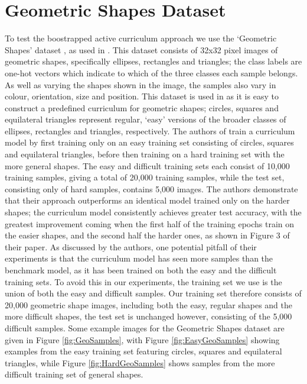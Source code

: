 \section{Geometric Shapes Dataset}\label{sec:GeoShapes}
To test the boostrapped active curriculum approach we use the `Geometric Shapes' dataset \cite{GeoShapes}, as used in \cite{Bengio2009}. This dataset consists of 32x32 pixel images of geometric shapes, specifically ellipses, rectangles and triangles; the class labels are one-hot vectors which indicate to which of the three classes each sample belongs. As well as varying the shapes shown in the image, the samples also vary in colour, orientation, size and position. This dataset is used in \cite{Bengio2009} as it is easy to construct a predefined curriculum for geometric shapes; circles, squares and equilateral triangles represent regular, `easy' versions of the broader classes of ellipses, rectangles and triangles, respectively. The authors of \cite{Bengio2009} train a curriculum model by first training only on an easy training set consisting of circles, squares and equilateral triangles, before then training on a hard training set with the more general shapes. The easy and difficult training sets each consist of 10,000 training samples, giving a total of 20,000 training samples, while the test set, consisting only of hard samples, contains 5,000 images. The authors demonstrate that their approach outperforms an identical model trained only on the harder shapes; the curriculum model consistently achieves greater test accuracy, with the greatest improvement coming  when the first half of the training epochs train on the easier shapes, and the second half the harder ones, as shown in Figure 3 of their paper. As discussed by the authors, one potential pitfall of their experiments is that the curriculum model has seen more samples than the benchmark model, as it has been trained on both the easy and the difficult training sets. To avoid this in our experiments, the training set we use is the union of both the easy and difficult samples. Our training set therefore consists of 20,000 geometric shape images, including both the easy, regular shapes and the more difficult shapes, the test set is unchanged however, consisting of the 5,000 difficult samples. Some example images for the Geometric Shapes dataset are given in Figure \ref{fig:GeoSamples}, with Figure \ref{fig:EasyGeoSamples} showing examples from the easy training set featuring circles, squares and equilateral triangles, while Figure \ref{fig:HardGeoSamples} shows samples from the more difficult training set of general shapes.

